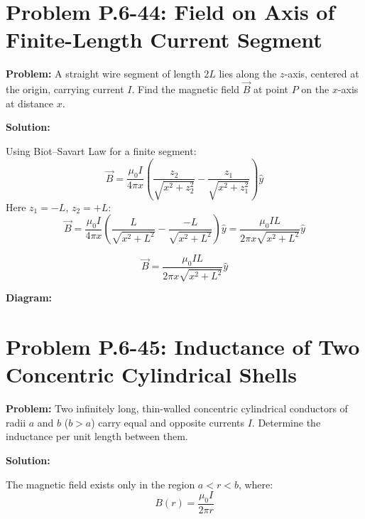 \documentclass[12pt]{article}
\begin{document}
\section*{Problem P.6-44: Field on Axis of Finite-Length Current Segment}

\textbf{Problem:}  
A straight wire segment of length \( 2L \) lies along the \( z \)-axis, centered at the origin, carrying current \( I \). Find the magnetic field \( \vec{B} \) at point \( P \) on the \( x \)-axis at distance \( x \).

\textbf{Solution:}

Using Biot–Savart Law for a finite segment:
\[
\vec{B} = \frac{\mu_0 I}{4\pi x} \left( \frac{z_2}{\sqrt{x^2 + z_2^2}} - \frac{z_1}{\sqrt{x^2 + z_1^2}} \right) \hat{y}
\]
Here \( z_1 = -L \), \( z_2 = +L \):
\[
\vec{B} = \frac{\mu_0 I}{4\pi x} \left( \frac{L}{\sqrt{x^2 + L^2}} - \frac{-L}{\sqrt{x^2 + L^2}} \right) \hat{y}
= \frac{\mu_0 I L}{2\pi x \sqrt{x^2 + L^2}} \hat{y}
\]

\begin{tcolorbox}
\[
\boxed{\vec{B} = \frac{\mu_0 I L}{2\pi x \sqrt{x^2 + L^2}} \hat{y}}
\]
\end{tcolorbox}

\textbf{Diagram:}
\begin{center}
\end{center}



\section*{Problem P.6-45: Inductance of Two Concentric Cylindrical Shells}

\textbf{Problem:}  
Two infinitely long, thin-walled concentric cylindrical conductors of radii \( a \) and \( b \) (\( b > a \)) carry equal and opposite currents \( I \). Determine the inductance per unit length between them.

\textbf{Solution:}

The magnetic field exists only in the region \( a < r < b \), where:
\[
B(r) = \frac{\mu_0 I}{2\pi r}
\]
\end{document}
